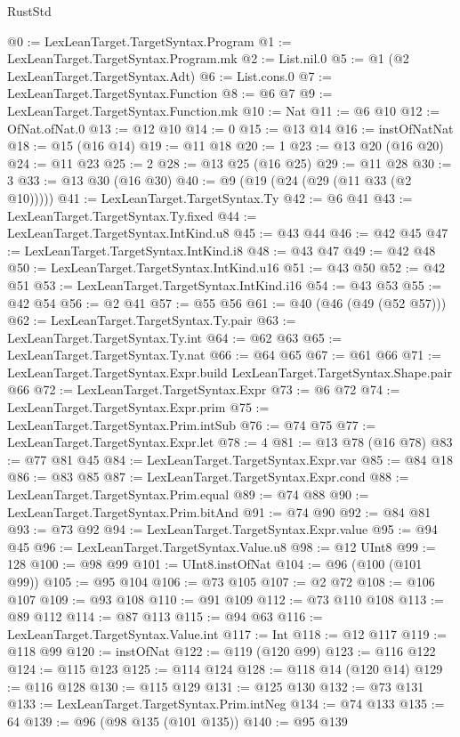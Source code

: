 \begin{lexlean}{RustStd}
\begin{coremodule}
{\begin{coremodule}
{{{{{@0 := LexLeanTarget.TargetSyntax.Program
@1 := LexLeanTarget.TargetSyntax.Program.mk
@2 := List.nil.{0}
@5 := @1 (@2 LexLeanTarget.TargetSyntax.Adt)
@6 := List.cons.{0}
@7 := LexLeanTarget.TargetSyntax.Function
@8 := @6 @7
@9 := LexLeanTarget.TargetSyntax.Function.mk
@10 := Nat
@11 := @6 @10
@12 := OfNat.ofNat.{0}
@13 := @12 @10
@14 := 0
@15 := @13 @14
@16 := instOfNatNat
@18 := @15 (@16 @14)
@19 := @11 @18
@20 := 1
@23 := @13 @20 (@16 @20)
@24 := @11 @23
@25 := 2
@28 := @13 @25 (@16 @25)
@29 := @11 @28
@30 := 3
@33 := @13 @30 (@16 @30)
@40 := @9 (@19 (@24 (@29 (@11 @33 (@2 @10)))))
@41 := LexLeanTarget.TargetSyntax.Ty
@42 := @6 @41
@43 := LexLeanTarget.TargetSyntax.Ty.fixed
@44 := LexLeanTarget.TargetSyntax.IntKind.u8
@45 := @43 @44
@46 := @42 @45
@47 := LexLeanTarget.TargetSyntax.IntKind.i8
@48 := @43 @47
@49 := @42 @48
@50 := LexLeanTarget.TargetSyntax.IntKind.u16
@51 := @43 @50
@52 := @42 @51
@53 := LexLeanTarget.TargetSyntax.IntKind.i16
@54 := @43 @53
@55 := @42 @54
@56 := @2 @41
@57 := @55 @56
@61 := @40 (@46 (@49 (@52 @57)))
@62 := LexLeanTarget.TargetSyntax.Ty.pair
@63 := LexLeanTarget.TargetSyntax.Ty.int
@64 := @62 @63
@65 := LexLeanTarget.TargetSyntax.Ty.nat
@66 := @64 @65
@67 := @61 @66
@71 := LexLeanTarget.TargetSyntax.Expr.build LexLeanTarget.TargetSyntax.Shape.pair @66
@72 := LexLeanTarget.TargetSyntax.Expr
@73 := @6 @72
@74 := LexLeanTarget.TargetSyntax.Expr.prim
@75 := LexLeanTarget.TargetSyntax.Prim.intSub
@76 := @74 @75
@77 := LexLeanTarget.TargetSyntax.Expr.let
@78 := 4
@81 := @13 @78 (@16 @78)
@83 := @77 @81 @45
@84 := LexLeanTarget.TargetSyntax.Expr.var
@85 := @84 @18
@86 := @83 @85
@87 := LexLeanTarget.TargetSyntax.Expr.cond
@88 := LexLeanTarget.TargetSyntax.Prim.equal
@89 := @74 @88
@90 := LexLeanTarget.TargetSyntax.Prim.bitAnd
@91 := @74 @90
@92 := @84 @81
@93 := @73 @92
@94 := LexLeanTarget.TargetSyntax.Expr.value
@95 := @94 @45
@96 := LexLeanTarget.TargetSyntax.Value.u8
@98 := @12 UInt8
@99 := 128
@100 := @98 @99
@101 := UInt8.instOfNat
@104 := @96 (@100 (@101 @99))
@105 := @95 @104
@106 := @73 @105
@107 := @2 @72
@108 := @106 @107
@109 := @93 @108
@110 := @91 @109
@112 := @73 @110 @108
@113 := @89 @112
@114 := @87 @113
@115 := @94 @63
@116 := LexLeanTarget.TargetSyntax.Value.int
@117 := Int
@118 := @12 @117
@119 := @118 @99
@120 := instOfNat
@122 := @119 (@120 @99)
@123 := @116 @122
@124 := @115 @123
@125 := @114 @124
@128 := @118 @14 (@120 @14)
@129 := @116 @128
@130 := @115 @129
@131 := @125 @130
@132 := @73 @131
@133 := LexLeanTarget.TargetSyntax.Prim.intNeg
@134 := @74 @133
@135 := 64
@139 := @96 (@98 @135 (@101 @135))
@140 := @95 @139
}}}}}
\end{coremodule}}
\end{coremodule}
\end{lexlean}
